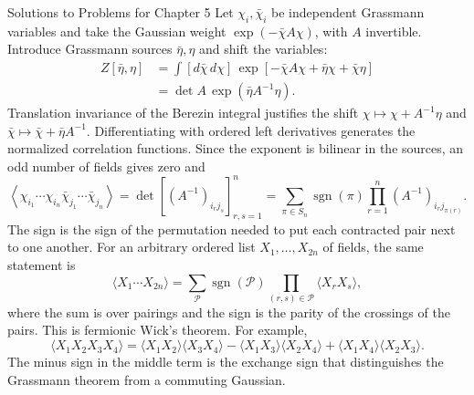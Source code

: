 \begin{bankssolutions}{Solutions to Problems for Chapter 5}
Let $\chi_i,\bar\chi_i$ be independent Grassmann variables and take the
Gaussian weight $\exp(-\bar\chi A\chi)$, with $A$ invertible. Introduce Grassmann
sources $\bar\eta,\eta$ and shift the variables:
\begin{align*}
 Z[\bar\eta,\eta]
 &=\int[d\bar\chi\,d\chi]\,
   \exp\left[-\bar\chi A\chi+\bar\eta\chi+\bar\chi\eta\right]\\
 &=\det A\,\exp(\bar\eta A^{-1}\eta).
\end{align*}
Translation invariance of the Berezin integral justifies the shift
$\chi\mapsto\chi+A^{-1}\eta$ and
$\bar\chi\mapsto\bar\chi+\bar\eta A^{-1}$. Differentiating with ordered left
derivatives generates the normalized correlation functions. Since the exponent
is bilinear in the sources, an odd number of fields gives zero and
\begin{equation*}
 \left\langle\chi_{i_1}\cdots\chi_{i_n}
 \bar\chi_{j_1}\cdots\bar\chi_{j_n}\right\rangle
 =\det\left[(A^{-1})_{i_rj_s}\right]_{r,s=1}^n
 =\sum_{\pi\in S_n}\operatorname{sgn}(\pi)
   \prod_{r=1}^n(A^{-1})_{i_rj_{\pi(r)}}.
\end{equation*}
The sign is the sign of the permutation needed to put each contracted pair next
to one another. For an arbitrary ordered list $X_1,\ldots,X_{2n}$ of fields,
the same statement is
\begin{equation*}
 \langle X_1\cdots X_{2n}\rangle
 =\sum_{\mathcal P}\operatorname{sgn}(\mathcal P)
   \prod_{(r,s)\in\mathcal P}\langle X_rX_s\rangle,
\end{equation*}
where the sum is over pairings and the sign is the parity of the crossings of
the pairs. This is fermionic Wick's theorem. For example,
\begin{equation*}
 \langle X_1X_2X_3X_4\rangle
 =\langle X_1X_2\rangle\langle X_3X_4\rangle
 -\langle X_1X_3\rangle\langle X_2X_4\rangle
 +\langle X_1X_4\rangle\langle X_2X_3\rangle.
\end{equation*}
The minus sign in the middle term is the exchange sign that distinguishes the
Grassmann theorem from a commuting Gaussian.


\end{bankssolutions}
